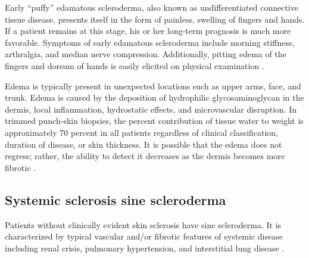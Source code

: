 Early ``puffy'' edamatous scleroderma, also known as undifferentiated
connective tissue disease, presents itself in the form of painless, swelling
of fingers and hands. If a patient remains at this stage, his or her long-term
prognosis is much more favorable. Symptoms of early edamatous scleroderma
include morning stiffness, arthralgia, and median nerve compression.
Additionally, pitting edema of the fingers and dorsum of hands is easily
elicited on physical examination \citep[1213]{kelley}.

Edema is typically present in unexpected locations such as upper arms, face,
and trunk. Edema is caused by the deposition of hydrophilic glycosaminoglycan
in the dermis, local inflammation, hydrostatic effects, and microvascular
disruption. In trimmed punch-skin biopsies, the percent contribution of tissue
water to weight is approximately 70 percent in all patients regardless of
clinical classification, duration of disease, or skin thickness. It is
possible that the edema does not regress; rather, the ability to detect it
decreases as the dermis becomes more fibrotic \citep[1213]{kelley}.

\subsection{Systemic sclerosis sine scleroderma}

Patients without clinically evident skin sclerosis have \ssc sine scleroderma.
It is characterized by typical vascular and/or fibrotic features of systemic
disease including renal crisis, pulmonary hypertension, and interstitial lung
disease \citep{overviewSSc}.

